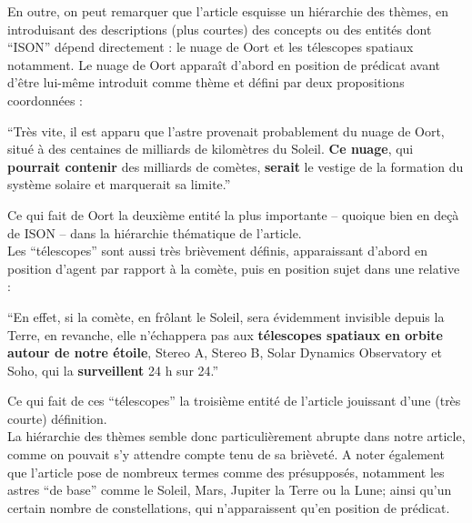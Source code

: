 \documentclass[a4paper,10pt]{article}
\begin{document}
			En outre, on peut remarquer que l'article esquisse un hiérarchie des thèmes, en introduisant des descriptions (plus courtes) des concepts ou des entités dont ``ISON'' dépend directement : le nuage de Oort et les télescopes spatiaux notamment. Le nuage de Oort apparaît d'abord en position de prédicat avant d'être lui-même introduit comme thème et défini
			par deux propositions coordonnées :
			\begin{center}
				\footnotesize
				\begin{minipage}{0.7\textwidth}
					``Très vite, il est apparu que l'astre provenait probablement du nuage de Oort, situé à des centaines de milliards de kilomètres du Soleil. \textbf{Ce nuage}, qui \textbf{pourrait contenir} des milliards de comètes, \textbf{serait} le vestige de la formation du système solaire et marquerait sa limite.'' 
				\end{minipage}
			\end{center}
			Ce qui fait de Oort la deuxième entité la plus importante -- quoique bien en deçà de ISON -- dans la hiérarchie thématique de l'article.\\
			Les ``télescopes'' sont aussi très brièvement définis, apparaissant d'abord en position d'agent par rapport à la comète, puis en position sujet dans une relative :
			\begin{center}
				\footnotesize
				\begin{minipage}{0.7\textwidth}
					``En effet, si la comète, en frôlant le Soleil, sera évidemment invisible depuis la Terre, en revanche, elle n'échappera pas aux \textbf{télescopes spatiaux en orbite autour de notre étoile}, Stereo A, Stereo B, Solar Dynamics Observatory et Soho, qui la \textbf{surveillent} 24 h sur 24.'' 
				\end{minipage}
			\end{center}
			Ce qui fait de ces ``télescopes'' la troisième entité de l'article jouissant d'une (très courte) définition.\\
			La hiérarchie des thèmes semble donc particulièrement abrupte dans notre article, comme on pouvait s'y attendre compte tenu de sa brièveté. A noter également que l'article pose de nombreux termes comme des présupposés, notamment les astres ``de base'' comme le Soleil, Mars, Jupiter la Terre ou la Lune; ainsi qu'un certain nombre de constellations, qui n'apparaissent qu'en position de prédicat.
\end{document}
